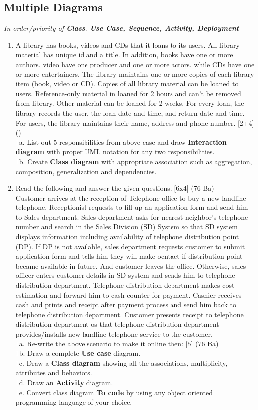 \documentclass[12pt]{article}
\newcommand{\enter}{\\\textcolor{white}{1}}
\begin{document}
  \subsection{Multiple Diagrams}
    \textit{In order/priority of \textbf{Class, Use Case, Sequence, Activity, Deployment}}
    \begin{enumerate}
      \item A library has books, videos and CDs that it loans to its users. All library material has unique id and a title. In addition, books have one or more authors, video have one producer and one or more actors, while CDs have one or more entertainers. The library maintains one or more copies of each library item (book, video or CD). Copies of all library material can be loaned to users. Reference-only material in loaned for 2 hours and can't be removed from library. Other material can be loaned for 2 weeks. For every loan, the library records the user, the loan date and time, and return date and time. For users, the library maintains their name, address and phone number. \hfill [2+4] ()
        \enter a. List out 5 responsibilities from above case and draw \textbf{Interaction diagram} with proper UML notation for any two responsibilities.
        \enter b. Create \textbf{Class diagram} with appropriate association such as aggregation, composition, generalization and dependencies.

      \item Read the following and answer the given questions. \hfill [6x4] (76 Ba)\\
        Customer arrives at the reception of Telephone office to buy a new landline telephone. Receptionist requests to fill up an application form and send him to Sales department. Sales department asks for nearest neighbor's telephone number and search in the Sales Division (SD) System so that SD system displays information including availability of telephone distribution point (DP). If DP is not available, sales department requests customer to submit application form and tells him they will make ocntact if distribution point became available in future. And customer leaves the office. Otherwise, sales officer enters customer details in SD system and sends him to telephone distribution department. Telephone distribution department makes cost estimation and forward him to cash counter for payment. Cashier receives cash and prints and receipt after payment process and send him back to telephone distribution department. Customer presents receipt to telephone distribution department os that telephone distribution department provides/installs new landline telephone service to the customer.
          \enter a. Re-write the above scenario to make it online then: \hfill [5] (76 Ba)
          \enter b. Draw a complete \textbf{Use case} diagram.
          \enter c. Draw a \textbf{Class diagram} showing all the associations, multiplicity, attributes and behaviors.
          \enter d. Draw an \textbf{Activity} diagram.
          \enter e. Convert class diagram \textbf{To code} by using any object oriented programming language of your choice.


\end{enumerate}
\end{document}
